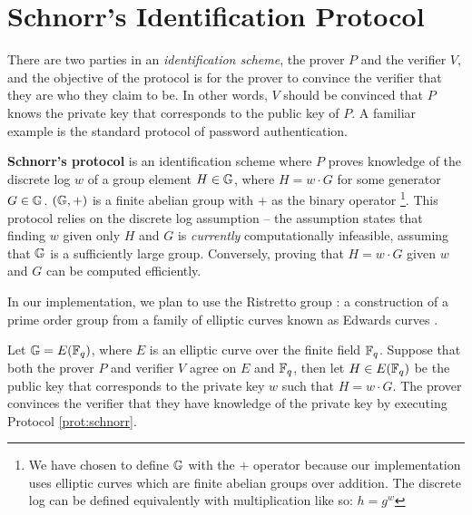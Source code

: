 \section{Schnorr's Identification Protocol}\label{sec:schnorr}
There are two parties in an \textit{identification scheme}, the prover $P$ and the verifier $V$, and the objective of the protocol is for the prover to convince the verifier that they are who they claim to be. In other words, $V$ should be convinced that $P$ knows the private key that corresponds to the public key of $P$. A familiar example is the standard protocol of password authentication.

\textbf{Schnorr's protocol} \cite{Schnorr} is an identification scheme where $P$ proves knowledge of the discrete log $w$ of a group element $H \in \mathbb{G}$, where $H = w \cdot G$ for some generator $G \in \mathbb{G}$. $(\mathbb{G}, +)$ is a finite abelian group with $+$ as the binary operator 
\footnote{We have chosen to define $\mathbb{G}$ with the $+$ operator because our implementation uses elliptic curves which are finite abelian groups over addition. The discrete log can be defined equivalently with multiplication like so: $h = g^w$}. 
This protocol relies on the discrete log assumption \cite{Diffie1976NewDI} -- the assumption states that finding $w$ given only $H$ and $G$ is \textit{currently} computationally infeasible, assuming that $\mathbb{G}$ is a sufficiently large group. Conversely, proving that $H = w \cdot G$ given $w$ and $G$ can be computed efficiently. 

In our implementation, we plan to use the Ristretto group \cite{ristretto_web}: a construction of a prime order group from a family of elliptic curves known as Edwards curves \cite{Edwards2007}. 

\begin{definition}\label{def:schnorr}
    Let $\mathbb{G} = E(\mathbb{F}_q)$, where $E$ is an elliptic curve over the finite field $\mathbb{F}_q$. Suppose that both the prover $P$ and verifier $V$ agree on $E$ and $\mathbb{F}_q$, then let $H \in E(\mathbb{F}_q)$ be the public key that corresponds to the private key $w$ such that $H = w \cdot G$. The prover convinces the verifier that they have knowledge of the private key by executing Protocol \ref{prot:schnorr}.
\end{definition}

